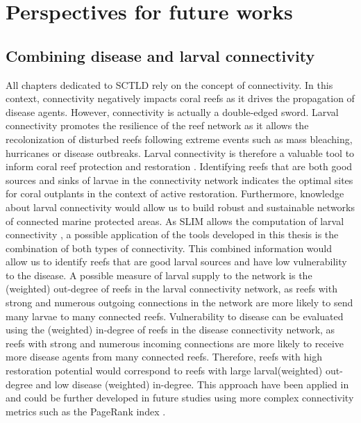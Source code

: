 \section{Perspectives for future works}

\subsection*{Combining disease and larval connectivity}
All chapters dedicated to SCTLD rely on the concept of connectivity. In this context, connectivity negatively impacts coral reefs as it drives the propagation of disease agents. However, connectivity is actually a double-edged sword. Larval connectivity promotes the resilience of the reef network as it allows the recolonization of disturbed reefs following extreme events such as mass bleaching, hurricanes or disease outbreaks. Larval connectivity is therefore a valuable tool to inform coral reef protection and restoration \citep{botsford2009connectivity,mumby2011reserve}. Identifying reefs that are both good sources and sinks of larvae in the connectivity network indicates the optimal sites for coral outplants in the context of active restoration. Furthermore, knowledge about larval connectivity would allow us to build robust and sustainable networks of connected marine protected areas. As SLIM allows the computation of larval connectivity \citep{thomas2014numerical,frys2020fine,figueiredo2021global}, a possible application of the tools developed in this thesis is the combination of both types of connectivity.  This combined information would allow us to identify reefs that are good larval sources and have low vulnerability to the disease. A possible measure of larval supply to the network is the (weighted) out-degree of reefs in the larval connectivity network, as reefs with strong and numerous outgoing connections in the network are more likely to send many larvae to many connected reefs. Vulnerability to disease can be evaluated using the (weighted) in-degree of reefs in the disease connectivity network, as reefs with strong and numerous incoming connections are more likely to receive more disease agents from many connected reefs. Therefore, reefs with high restoration potential would correspond to reefs with large larval(weighted) out-degree and low disease (weighted) in-degree. This approach have been applied in \cite{holstein2022} and could be further developed in future studies using more complex connectivity metrics such as the PageRank index \citep{frys2020fine}. 

